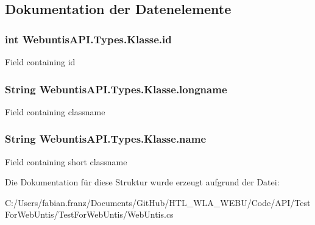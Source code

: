 \subsection{Dokumentation der Datenelemente}
\hypertarget{struct_webuntis_a_p_i_1_1_types_1_1_klasse_a0c8d6c1ce71142b67d20df2c818bbc75}{
\subsubsection[{id}]{\setlength{\rightskip}{0pt plus 5cm}int Webuntis\-A\-P\-I.\-Types.\-Klasse.\-id}}\label{struct_webuntis_a_p_i_1_1_types_1_1_klasse_a0c8d6c1ce71142b67d20df2c818bbc75}
Field containing id \hypertarget{struct_webuntis_a_p_i_1_1_types_1_1_klasse_a0ec00ea38031e97b255fa139387142e7}{
\subsubsection[{longname}]{\setlength{\rightskip}{0pt plus 5cm}String Webuntis\-A\-P\-I.\-Types.\-Klasse.\-longname}}\label{struct_webuntis_a_p_i_1_1_types_1_1_klasse_a0ec00ea38031e97b255fa139387142e7}
Field containing classname \hypertarget{struct_webuntis_a_p_i_1_1_types_1_1_klasse_a034b759d9d7262da6eaa0613d5f6a0e7}{
\subsubsection[{name}]{\setlength{\rightskip}{0pt plus 5cm}String Webuntis\-A\-P\-I.\-Types.\-Klasse.\-name}}\label{struct_webuntis_a_p_i_1_1_types_1_1_klasse_a034b759d9d7262da6eaa0613d5f6a0e7}
Field containing short classname 

Die Dokumentation für diese Struktur wurde erzeugt aufgrund der Datei\-:\begin{DoxyCompactItemize}
\item 
C\-:/\-Users/fabian.\-franz/\-Documents/\-Git\-Hub/\-H\-T\-L\-\_\-\-W\-L\-A\-\_\-\-W\-E\-B\-U/\-Code/\-A\-P\-I/\-Test\-For\-Web\-Untis/\-Test\-For\-Web\-Untis/Web\-Untis.\-cs\end{DoxyCompactItemize}
